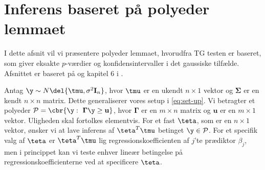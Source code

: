 \section{Inferens baseret på polyeder lemmaet} \label{subsec:teste_polyhedron}
I dette afsnit vil vi præsentere polyeder lemmaet, hvorudfra TG testen er baseret, som giver eksakte \(p\)-værdier og konfidensintervaller i det gaussiske tilfælde.
Afsnittet er baseret på \citep{post_inference} og kapitel 6 i \citep{hastie}.

%

Antag \(\y \sim N \del{\tmu, \sigma^2 \mathbf{I}_n }\), hvor \(\tmu\) er en ukendt \(n \times 1\) vektor og \(\boldsymbol{\Sigma}\) er en kendt \(n \times n\) matrix.
Dette generaliserer vores setup i \eqref{eq:set-up}.
Vi betragter et polyeder \(\mathcal{P} = \cbr{\y : \ \boldsymbol{\Gamma} \y \geq \mathbf{u}}\), hvor \(\boldsymbol{\Gamma}\) er en \(m \times n\) matrix og \(\mathbf{u}\) er en \(m \times 1\) vektor. Uligheden skal fortolkes elementvis.
For et fast \(\teta\), som er en \(n \times 1\) vektor, ønsker vi at lave inferens af \(\teta^T \tmu\) betinget \(\y \in \mathcal{P}\).
For et specifik valg af \(\teta\) er \(\teta^T \tmu\) lig regressionskoefficienten af \(j\)'te prædiktor \(\beta_j\), men i princippet kan vi teste enhver lineær betingelse på regressionskoefficienterne ved at specificere \(\teta\).

%
%
%

